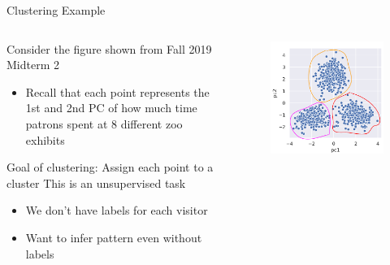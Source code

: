 \documentclass[aspectratio=169]{../latex_main/tntbeamer}  %
\begin{document}
	
	\begin{frame}{Clustering Example}
	    \begin{columns}
	        \begin{column}{.5\textwidth}
	            Consider the figure shown from Fall 2019 Midterm 2
	                \begin{itemize}
	                    \item Recall that each point represents the 1st and 2nd PC of how much time patrons spent at 8 different zoo exhibits
	                \end{itemize}
	                \bigskip
	                Goal of clustering: Assign each point to a cluster
	                \bigskip
	                This is an unsupervised task
	                \begin{itemize}
	                    \item We don’t have labels for each visitor
	                    \item Want to infer pattern even without labels
	                \end{itemize}
	        \end{column}
	        
	        
	        \begin{column}{.5\textwidth}
	                \begin{figure}
	                    \centering
	                    \includegraphics[scale=.35]{Bild3}
	                \end{figure}
	        \end{column}
	    \end{columns}
	\end{frame}
	
\end{document}
